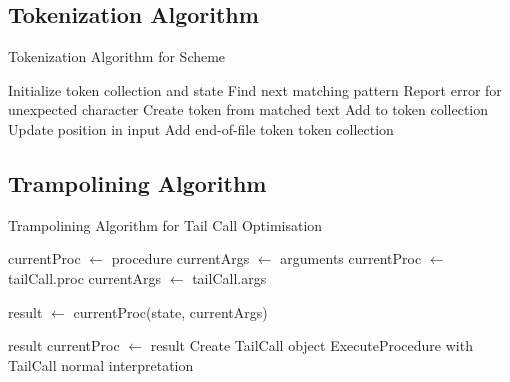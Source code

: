 \documentclass[final]{cmpreport_02}
\begin{document}
\subsection{Tokenization Algorithm} \label{app:tokenize}
\begin{algorithm}
\caption{Tokenization Algorithm for Scheme}
\label{alg:tokenize}
\begin{algorithmic}[1]
    \State Initialize token collection and state
        \State Find next matching pattern
            \State Report error for unexpected character
        \Else
            \State Create token from matched text
                \State Add to token collection
            \EndIf
            \State Update position in input
        \EndIf
    \EndWhile
    \State Add end-of-file token
    \State \Return token collection
\EndProcedure
\end{algorithmic}
\end{algorithm}
\subsection{Trampolining Algorithm} \label{app:trampoline}

\begin{algorithm}
\caption{Trampolining Algorithm for Tail Call Optimisation}
\label{alg:trampoline}
\begin{algorithmic}[1]
\State currentProc $\gets$ procedure
\State currentArgs $\gets$ arguments
        \State currentProc $\gets$ tailCall.proc
        \State currentArgs $\gets$ tailCall.args
    \EndWhile
    
    \State result $\gets$ currentProc(state, currentArgs)
    
        \State \Return result
    \Else
        \State currentProc $\gets$ result
    \EndIf
\EndWhile
\EndProcedure
{}
\State Create TailCall object
\State \Return ExecuteProcedure with TailCall
\Else
\State \Return normal interpretation
\EndIf
\EndProcedure
\end{algorithmic}
\end{algorithm}
\end{document}
